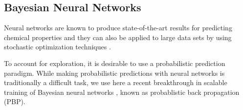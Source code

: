 \subsection{Bayesian Neural Networks}

\def\i{^{(i)}}
\def\xopt{\vx_\star}
\def\xrec{\widetilde\vx}
\def\X{\calX}
\def\D{\calD}
\def\H{\mathrm{H}}
\newcommand{\x}{\mathbf{x}}
\newcommand{\EI}{\textrm{EI}}
\newcommand{\C}{\mathcal{C}}
\newcommand{\given}{\,|\,}
\newcommand{\DistGam}{\text{Gam}}



Neural networks are known to produce state-of-the-art results for predicting chemical properties 
\cite{Ma_2015,Mayr_2016,ramsundar2015massively} and they can also be applied to large data sets by using 
stochastic optimization techniques \cite{bousquet2008tradeoffs}.

To account for exploration, it is desirable to use a probabilistic prediction paradigm. While making probabilistic predictions with neural networks is traditionally a difficult task, we use here a recent breakthrough in scalable training of Bayesian neural networks \cite{hernandez2015probabilistic}, known as probablistic back propagation (PBP). 

